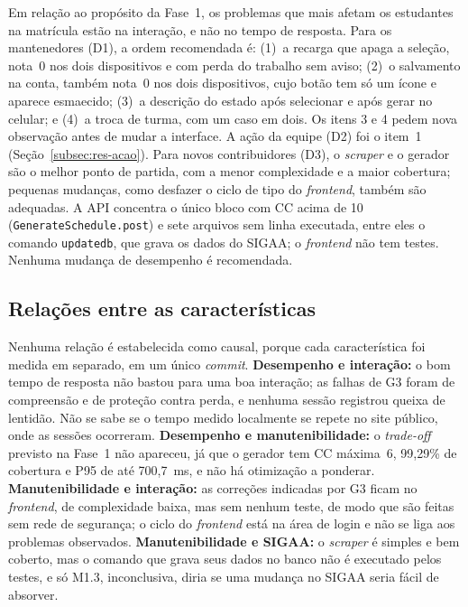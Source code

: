 \documentclass[12pt]{article}
\begin{document}
Em relação ao propósito da Fase~1, os problemas que mais afetam os estudantes na
matrícula estão na interação, e não no tempo de resposta. Para os mantenedores
(D1), a ordem recomendada é: (1)~a recarga que apaga a seleção, nota~0 nos dois
dispositivos e com perda do trabalho sem aviso; (2)~o salvamento na conta, também
nota~0 nos dois dispositivos, cujo botão tem só um ícone e aparece esmaecido;
(3)~a descrição do estado após selecionar e após gerar no celular; e (4)~a troca
de turma, com um caso em dois. Os itens 3 e 4 pedem nova observação antes de
mudar a interface. A ação da equipe (D2) foi o item~1
(Seção~\ref{subsec:res-acao}). Para novos contribuidores (D3), o \textit{scraper}
e o gerador são o melhor ponto de partida, com a menor complexidade e a maior
cobertura; pequenas mudanças, como desfazer o ciclo de tipo do \textit{frontend},
também são adequadas. A API concentra o único bloco com CC acima de 10
(\texttt{GenerateSchedule.post}) e sete arquivos sem linha executada, entre eles
o comando \texttt{updatedb}, que grava os dados do SIGAA; o \textit{frontend} não
tem testes. Nenhuma mudança de desempenho é recomendada.

\subsection{Relações entre as características}\label{subsec:relacoes}

Nenhuma relação é estabelecida como causal, porque cada característica foi
medida em separado, em um único \textit{commit}. \textbf{Desempenho e
interação:} o bom tempo de resposta não bastou para uma boa interação; as falhas
de G3 foram de compreensão e de proteção contra perda, e nenhuma sessão registrou
queixa de lentidão. Não se sabe se o tempo medido localmente se repete no site
público, onde as sessões ocorreram. \textbf{Desempenho e manutenibilidade:} o
\textit{trade-off} previsto na Fase~1 não apareceu, já que o gerador tem CC
máxima~6, 99,29\% de cobertura e P95 de até 700,7~ms, e não há otimização a
ponderar. \textbf{Manutenibilidade e interação:} as correções indicadas por G3
ficam no \textit{frontend}, de complexidade baixa, mas sem nenhum teste, de modo
que são feitas sem rede de segurança; o ciclo do \textit{frontend} está na área
de login e não se liga aos problemas observados. \textbf{Manutenibilidade e
SIGAA:} o \textit{scraper} é simples e bem coberto, mas o comando que grava seus
dados no banco não é executado pelos testes, e só M1.3, inconclusiva, diria se
uma mudança no SIGAA seria fácil de absorver.
\end{document}
